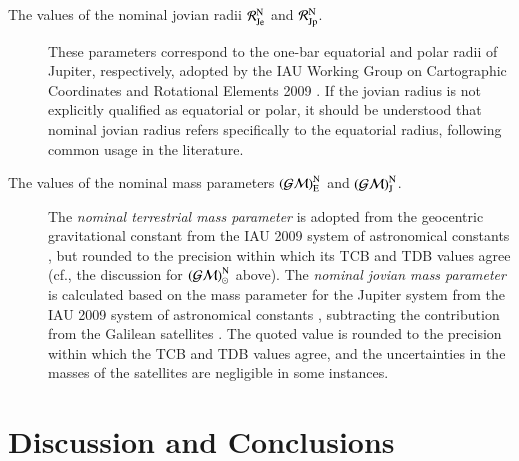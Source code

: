 \documentclass[preprint]{aastex}
\newcommand{\GMnom}{\hbox{$\mathcal{(GM)}^{\mathrm N}_\odot$}}
\newcommand{\RJenom}{\hbox{$\mathcal{R}^{\mathrm N}_\mathrm{Je}$}}
\newcommand{\RJpnom}{\hbox{$\mathcal{R}^{\mathrm N}_\mathrm{Jp}$}}
\newcommand{\GMEnom}{\hbox{$\mathcal{(GM)}^{\mathrm N}_\mathrm{E}$}}
\newcommand{\GMJnom}{\hbox{$\mathcal{(GM)}^{\mathrm N}_\mathrm{J}$}}
\begin{document}
\begin{description}
\item[The values of the nominal jovian radii $\RJenom$ and $\RJpnom$.] These parameters correspond to the one-bar equatorial and polar radii of Jupiter, respectively, adopted by the IAU Working Group on Cartographic Coordinates and Rotational Elements 2009 \citep{archinal2011}. If the jovian radius is not explicitly qualified as equatorial or polar, it should be understood that nominal jovian radius refers specifically to the equatorial radius, following common usage in the literature.

\item[The values of the nominal mass parameters $\GMEnom$ and $\GMJnom$.] The \emph{nominal terrestrial mass parameter} is ad\-op\-t\-ed from the geocentric gravitational constant from the IAU 2009 system of astronomical constants \citep{luzum2011}, but rounded to the precision within which its TCB and TDB values agree (cf., the discussion for $\GMnom$ above). The \emph{nominal jovian mass parameter} is calculated based on the mass parameter for the Jupiter system from the IAU 2009 system of astronomical constants \citep{luzum2011}, subtracting the contribution from the Galilean satellites \citep{jacobson2000}. The quoted value is rounded to the precision within which the TCB and TDB values agree, and the uncertainties in the masses of the satellites are negligible in some instances.
\end{description}

\section{Discussion and Conclusions}
\end{document}

